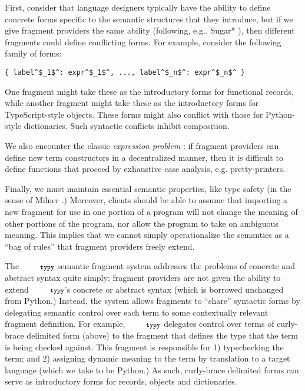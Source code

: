 \documentclass[10pt]{sigplanconf}
\newcommand{\typy}{\texttt{\footnotesize typy}}
\begin{document}

First, consider that language designers typically have the ability to define concrete forms specific to the semantic structures that they introduce, but if we give fragment providers the same ability (following, e.g., Sugar* \cite{erdweg2013framework}), then different fragments could define conflicting forms. For example, consider the following family of forms:
\vspace{-2px}\begin{lstlisting}[numbers=none]
{ label^$_1$^: expr^$_1$^, ..., label^$_n$^: expr^$_n$^ }
\end{lstlisting}
One fragment might take these as the introductory forms for functional records, while another fragment might take these as the introductory forms for TypeScript-style objects. These forms might also conflict with those for Python-style dictionaries. Such syntactic conflicts inhibit composition.

We also encounter the classic \emph{expression problem} \cite{wadler1998expression,Reynolds75}: if fragment providers can define new term constructors in a decentralized manner, then it is difficult to define functions that proceed by exhaustive case analysis, e.g. pretty-printers.

Finally, we must maintain essential semantic properties, like type safety (in the sense of Milner \cite{DBLP:journals/jcss/Milner78}.) Moreover, clients should be able to  assume that importing a new fragment for use in one portion of a program will not change the meaning of other portions of the program, nor allow the program to take on ambiguous meaning. This implies that we cannot simply operationalize the semantics as a ``bag of rules'' that fragment providers freely extend.

The $\typy$ semantic fragment system addresses the problems of concrete and abstract syntax quite simply: fragment providers are not given the ability to extend $\typy$'s concrete or abstract syntax (which is borrowed unchanged from Python.)  Instead, the system allows fragments to ``share'' syntactic forms by delegating semantic control over each term to some contextually relevant fragment definition. For example, $\typy$ delegates control over terms of curly-brace delimited form (above) to the fragment that defines the type that the term is being checked against. This fragment is responsible for 1) typechecking the term; and 2) assigning dynamic meaning to the term by translation to a target language (which we take to be Python.) As such, curly-brace delimited forms can serve as introductory forms for records, objects and dictionaries. 
\end{document}
